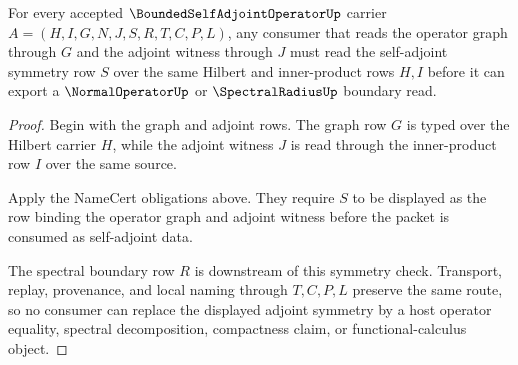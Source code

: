 \begin{theorem}
\label{thm:bounded-self-adjoint-operator-adjoint-symmetry}
For every accepted $\BoundedSelfAdjointOperatorUp$ carrier $A=(H,I,G,N,J,S,R,T,C,P,L)$, any consumer that reads the operator graph through $G$ and the adjoint witness through $J$ must read the self-adjoint symmetry row $S$ over the same Hilbert and inner-product rows $H,I$ before it can export a $\NormalOperatorUp$ or $\SpectralRadiusUp$ boundary read.
\end{theorem}
\begin{proof}
Begin with the graph and adjoint rows. The graph row $G$ is typed over the Hilbert carrier $H$, while the adjoint witness $J$ is read through the inner-product row $I$ over the same source.

Apply the NameCert obligations above. They require $S$ to be displayed as the row binding the operator graph and adjoint witness before the packet is consumed as self-adjoint data.

The spectral boundary row $R$ is downstream of this symmetry check. Transport, replay, provenance, and local naming through $T,C,P,L$ preserve the same route, so no consumer can replace the displayed adjoint symmetry by a host operator equality, spectral decomposition, compactness claim, or functional-calculus object.
\end{proof}

